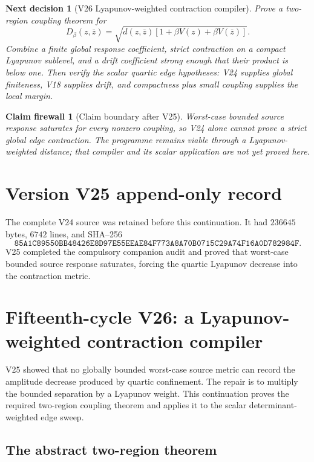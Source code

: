 \documentclass[11pt]{article}
\newtheorem{firewall}[theorem]{Claim firewall}
\newtheorem{decision}[theorem]{Next decision}
\theoremstyle{remark}
\begin{document}
\begin{decision}[V26 Lyapunov-weighted contraction compiler]
\label{dec:v15v25-next}
Prove a two-region coupling theorem for
\[
 D_\beta(z,\bar z)
 =
 \sqrt{
 d(z,\bar z)
 [1+\beta V(z)+\beta V(\bar z)]
 }.
\]
Combine a finite global response coefficient, strict contraction on
a compact Lyapunov sublevel, and a drift coefficient strong enough
that their product is below one.  Then verify the scalar quartic
edge hypotheses: V24 supplies global finiteness, V18 supplies drift,
and compactness plus small coupling supplies the local margin.
\end{decision}

\begin{firewall}[Claim boundary after V25]
\label{fire:v15v25}
Worst-case bounded source response saturates for every nonzero
coupling, so V24 alone cannot prove a strict global edge contraction.
The programme remains viable through a Lyapunov-weighted distance;
that compiler and its scalar application are not yet proved here.
\end{firewall}

\section*{Version V25 append-only record}
The complete V24 source was retained before this continuation.  It
had \(236645\) bytes, \(6742\) lines, and SHA--256
\[
 \texttt{85A1C89550BB48426E8D97E55EEAE84F773A8A70B0715C29A74F16A0D782984F}.
\]
V25 completed the compulsory companion audit and proved that
worst-case bounded source response saturates, forcing the quartic
Lyapunov decrease into the contraction metric.
\section{Fifteenth-cycle V26: a Lyapunov-weighted contraction compiler}
\label{sec:v15v26}

V25 showed that no globally bounded worst-case source metric can
record the amplitude decrease produced by quartic confinement.  The
repair is to multiply the bounded separation by a Lyapunov weight.
This continuation proves the required two-region coupling theorem
and applies it to the scalar determinant-weighted edge sweep.

\subsection{The abstract two-region theorem}
\end{document}
